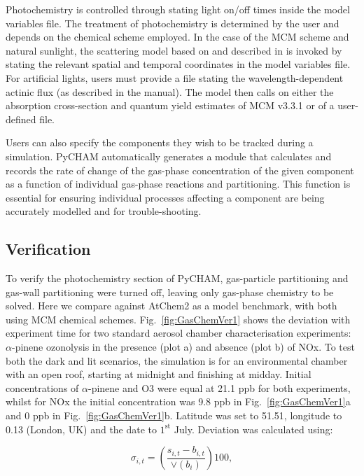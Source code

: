 \documentclass[gmd, manuscript]{copernicus}
\begin{document}
Photochemistry is controlled through stating light on/off times inside the model variables file.  The treatment of photochemistry is determined by the user and depends on the chemical scheme employed.  In the case of the MCM scheme and natural sunlight, the scattering model based on \citet{Hayman1997} and described in \citet{Saunders2003} is invoked by stating the relevant spatial and temporal coordinates in the model variables file.  For artificial lights, users must provide a file stating the wavelength-dependent actinic flux (as described in the manual).  The model then calls on either the absorption cross-section and quantum yield estimates of MCM v3.3.1 or of a user-defined file.

Users can also specify the components they wish to be tracked during a simulation.  PyCHAM automatically generates a module that calculates and records the rate of change of the gas-phase concentration of the given component as a function of individual gas-phase reactions and partitioning.  This function is essential for ensuring individual processes affecting a component are being accurately modelled and for trouble-shooting.


\subsection{Verification}
To verify the photochemistry section of PyCHAM, gas-particle partitioning and gas-wall partitioning were turned off, leaving only gas-phase chemistry to be solved.  Here we compare against AtChem2 \citep{sommariva_acm2018} as a model benchmark, with both using MCM chemical schemes.  Fig.~\ref{fig:GasChemVer1} shows the deviation with experiment time for two standard aerosol chamber characterisation experiments: $\alpha$-pinene ozonolysis in the presence (plot a) and absence (plot b) of NOx.  To test both the dark and lit scenarios, the simulation is for an environmental chamber with an open roof, starting at midnight and finishing at midday.  Initial concentrations of $\alpha$-pinene and O3 were equal at 21.1 ppb for both experiments, whilst for NOx the initial concentration was 9.8 ppb in Fig.~\ref{fig:GasChemVer1}a and 0 ppb in Fig.~\ref{fig:GasChemVer1}b.  Latitude was set to 51.51, longitude to 0.13 (London, UK) and the date to $\mathrm{1^{st}}$ July.  Deviation was calculated using:

\begin{equation} \label{eq:frac_dev}
\sigma_{i,t} = \left(\frac{s_{i,t}-b_{i,t}}{\lor(b_{i})}\right)100\mathrm{,}
\end{equation}
\end{document}
